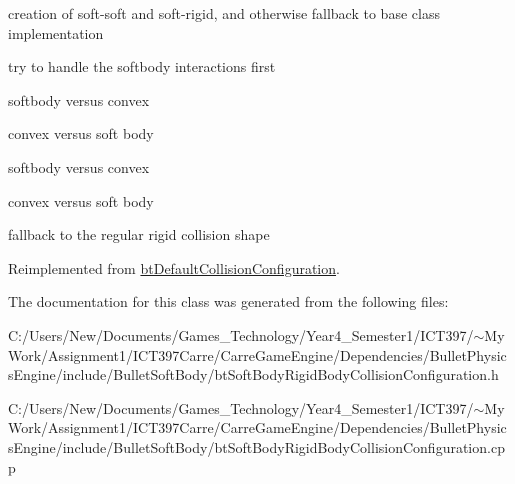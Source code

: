 creation of soft-soft and soft-rigid, and otherwise fallback to base class implementation 



try to handle the softbody interactions first

softbody versus convex

convex versus soft body

softbody versus convex

convex versus soft body

fallback to the regular rigid collision shape 

Reimplemented from \hyperlink{classbt_default_collision_configuration}{btDefaultCollisionConfiguration}.

The documentation for this class was generated from the following files:\begin{CompactItemize}
\item 
C:/Users/New/Documents/Games\_\-Technology/Year4\_\-Semester1/ICT397/$\sim$My Work/Assignment1/ICT397Carre/CarreGameEngine/Dependencies/BulletPhysicsEngine/include/BulletSoftBody/btSoftBodyRigidBodyCollisionConfiguration.h\item 
C:/Users/New/Documents/Games\_\-Technology/Year4\_\-Semester1/ICT397/$\sim$My Work/Assignment1/ICT397Carre/CarreGameEngine/Dependencies/BulletPhysicsEngine/include/BulletSoftBody/btSoftBodyRigidBodyCollisionConfiguration.cpp\end{CompactItemize}
